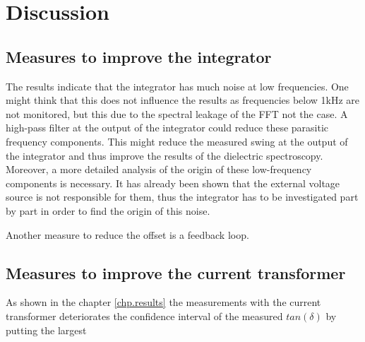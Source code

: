 \chapter{Discussion}

\section{Measures to improve the integrator}
The results indicate that the integrator has much noise at low frequencies. One might think that this does not influence the results as frequencies below 1kHz are not monitored, but this due to the spectral leakage of the FFT not the case.  A high-pass filter at the output of the integrator could reduce these parasitic frequency components. This might reduce the measured swing at the output of the integrator and thus improve the results of the dielectric spectroscopy. 
Moreover, a more detailed analysis of the origin of these low-frequency components is necessary. It has already been shown that the external voltage source is not responsible for them, thus the integrator has to be investigated part by part in order to find the origin of this noise. 

Another measure to reduce the offset is a feedback loop. 

\section{Measures to improve the current transformer}
As shown in the chapter \ref{chp.results} the measurements with the current transformer deteriorates the confidence interval of the measured $tan(\delta)$ by putting the largest 
